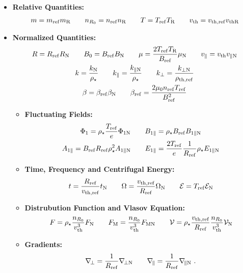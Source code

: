 \begin{itemize}
    \item \textbf{Relative Quantities:}
        \begin{gather*}
            m = m_\mathrm{ref} m_\mathrm{R} \qquad n_{R_0} = n_\mathrm{ref} n_\mathrm{R} \qquad T = T_\mathrm{ref} T_\mathrm{R} \qquad v_\mathrm{th} = v_{\mathrm{th},\mathrm{ref}} v_{\mathrm{th} \mathrm{R}}
        \end{gather*}
    \item \textbf{Normalized Quantities:}
        \begin{gather*}
            R = R_\mathrm{ref} R_\mathrm{N} \qquad B_0 = B_\mathrm{ref} B_\mathrm{N} \qquad \mu = \frac{2 T_\mathrm{ref} T_\mathrm{R}}{B_\mathrm{ref}} \mu_\mathrm{N} \qquad v_\parallel = v_\mathrm{th} v_{\parallel \mathrm{N}} \\
            k = \frac{k_\mathrm{N}}{\rho_\star} \qquad k_\parallel = \frac{k_{\parallel \mathrm{N}}}{\rho_\star} \qquad k_\perp = \frac{k_{\perp \mathrm{N}}}{\rho_{\mathrm{th},\mathrm{ref}}} \\
            \beta = \beta_\mathrm{ref} \beta_\mathrm{N} \qquad \beta_\mathrm{ref} = \frac{2 \mu_0 n_\mathrm{ref} T_\mathrm{ref}}{B_\mathrm{ref}^2}
        \end{gather*}
        \begin{itemize}
            \item \textbf{Fluctuating Fields:}
                \begin{gather*}
                    \Phi_1 = \rho_\star \frac{T_\mathrm{ref}}{e} \Phi_{1 \mathrm{N}} \qquad B_{1\parallel} = \rho_\star B_\mathrm{ref} B_{1\parallel \mathrm{N}} \\
                    A_{1\parallel} = B_\mathrm{ref} R_\mathrm{ref} \rho_\star^2 A_{1\parallel \mathrm{N}} \qquad E_{1\parallel} = \frac{2T_\mathrm{ref}}{e} \frac{1}{R_\mathrm{ref}} \rho_\star E_{1\parallel \mathrm{N}}
                \end{gather*}
            \item \textbf{Time, Frequency and Centrifugal Energy:}
                \begin{gather*}
                    t = \frac{R_\mathrm{ref}}{v_{\mathrm{th},\mathrm{ref}}} t_\mathrm{N} \qquad \Omega = \dfrac{v_{\mathrm{th},\mathrm{ref}}}{R_\mathrm{ref}} \Omega_\mathrm{N} \qquad \mathcal{E} = T_\mathrm{ref} \mathcal{E}_\mathrm{N}
                \end{gather*}
            \item \textbf{Distrubution Function and Vlasov Equation:}
                \begin{gather*}
                    F = \rho_\star \frac{n_{R_0}}{v_\mathrm{th}^3}F_\mathrm{N} \qquad F_\mathrm{M} = \frac{n_{R_0}}{v_\mathrm{th}^3} F_{\mathrm{M} \mathrm{N}} \qquad \mathcal{V} = \rho_\star \frac{v_{\mathrm{th},\mathrm{ref}}}{R_\mathrm{ref}}\frac{n_{R_0}}{v_\mathrm{th}^3}\mathcal{V}_\mathrm{N}
                \end{gather*}
            \item \textbf{Gradients:}
                \begin{gather*}
                    \nabla_{\!\perp} = \frac{1}{R_\mathrm{ref}} \nabla_{\!\perp \mathrm{N}} \qquad \nabla_{\!\parallel} = \frac{1}{R_\mathrm{ref}} \nabla_{\!\parallel \mathrm{N}} ~.
                \end{gather*}
        \end{itemize}
\end{itemize}